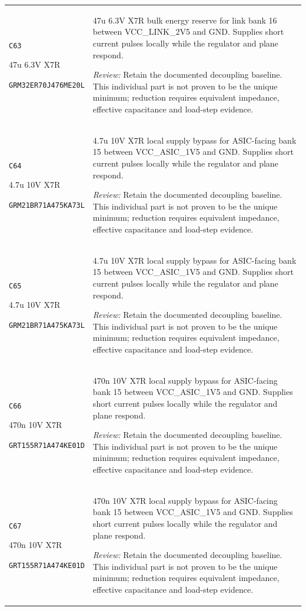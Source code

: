 \documentclass[10pt,a4paper]{article}
\begin{document}
\begin{longtable}{@{}P{46mm}P{117mm}@{}}
\nolinkurl{C63}\par 47u 6.3V X7R\par\scriptsize \nolinkurl{GRM32ER70J476ME20L} & 47u 6.3V X7R bulk energy reserve for link bank 16 between VCC\_LINK\_2V5 and GND. Supplies short current pulses locally while the regulator and plane respond.\par\smallskip\textit{Review:} Retain the documented decoupling baseline. This individual part is not proven to be the unique minimum; reduction requires equivalent impedance, effective capacitance and load-step evidence. \\
\nolinkurl{C64}\par 4.7u 10V X7R\par\scriptsize \nolinkurl{GRM21BR71A475KA73L} & 4.7u 10V X7R local supply bypass for ASIC-facing bank 15 between VCC\_ASIC\_1V5 and GND. Supplies short current pulses locally while the regulator and plane respond.\par\smallskip\textit{Review:} Retain the documented decoupling baseline. This individual part is not proven to be the unique minimum; reduction requires equivalent impedance, effective capacitance and load-step evidence. \\
\nolinkurl{C65}\par 4.7u 10V X7R\par\scriptsize \nolinkurl{GRM21BR71A475KA73L} & 4.7u 10V X7R local supply bypass for ASIC-facing bank 15 between VCC\_ASIC\_1V5 and GND. Supplies short current pulses locally while the regulator and plane respond.\par\smallskip\textit{Review:} Retain the documented decoupling baseline. This individual part is not proven to be the unique minimum; reduction requires equivalent impedance, effective capacitance and load-step evidence. \\
\nolinkurl{C66}\par 470n 10V X7R\par\scriptsize \nolinkurl{GRT155R71A474KE01D} & 470n 10V X7R local supply bypass for ASIC-facing bank 15 between VCC\_ASIC\_1V5 and GND. Supplies short current pulses locally while the regulator and plane respond.\par\smallskip\textit{Review:} Retain the documented decoupling baseline. This individual part is not proven to be the unique minimum; reduction requires equivalent impedance, effective capacitance and load-step evidence. \\
\nolinkurl{C67}\par 470n 10V X7R\par\scriptsize \nolinkurl{GRT155R71A474KE01D} & 470n 10V X7R local supply bypass for ASIC-facing bank 15 between VCC\_ASIC\_1V5 and GND. Supplies short current pulses locally while the regulator and plane respond.\par\smallskip\textit{Review:} Retain the documented decoupling baseline. This individual part is not proven to be the unique minimum; reduction requires equivalent impedance, effective capacitance and load-step evidence. \\

\end{longtable}
\end{document}
